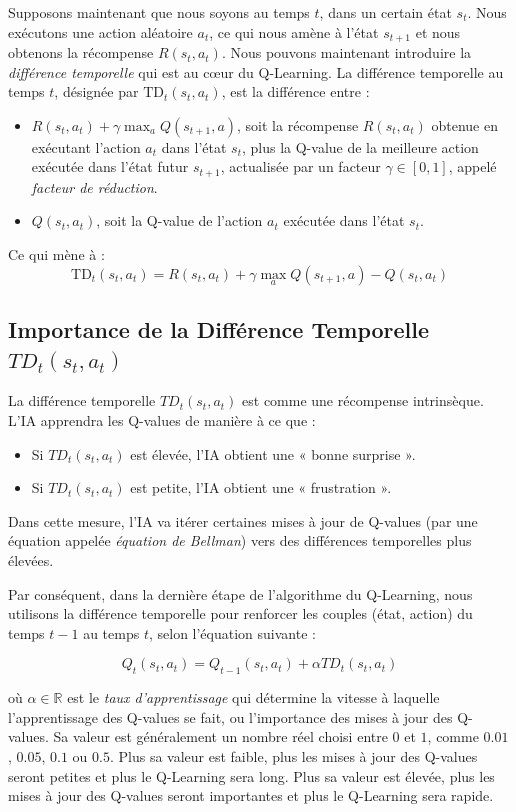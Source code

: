 \documentclass{article}
\begin{document}
Supposons maintenant que nous soyons au temps $t$, dans un certain état $s_t$. Nous exécutons une action aléatoire $a_t$, ce qui nous amène à l'état $s_{t+1}$ et nous obtenons la récompense $R(s_t, a_t)$.
Nous pouvons maintenant introduire la \emph{différence temporelle} qui est au cœur du Q-Learning. La différence temporelle au temps $t$, désignée par $\text{TD}_t(s_t, a_t)$, est la différence entre :
\begin{itemize}
    \item $R(s_t, a_t) + \gamma \max_a Q(s_{t+1}, a)$, soit la récompense $R(s_t, a_t)$ obtenue en exécutant l'action $a_t$ dans l'état $s_t$, plus la Q-value de la meilleure action exécutée dans l'état futur $s_{t+1}$, actualisée par un facteur $\gamma \in [0, 1]$, appelé \emph{facteur de réduction}.
    
    \item $Q(s_t, a_t)$, soit la Q-value de l'action $a_t$ exécutée dans l'état $s_t$.
\end{itemize}
Ce qui mène à :
\[
\text{TD}_t(s_t, a_t) = R(s_t, a_t) + \gamma \max_a Q(s_{t+1}, a) - Q(s_t, a_t)
\]
\subsection{Importance de la Différence Temporelle $TD_t(s_t, a_t)$ }

La différence temporelle $TD_t(s_t, a_t)$ est comme une récompense intrinsèque. L'IA apprendra les Q-values de manière à ce que :
\begin{itemize}
    \item Si $TD_t(s_t, a_t)$ est élevée, l'IA obtient une « bonne surprise ».
    \item Si $TD_t(s_t, a_t)$ est petite, l'IA obtient une « frustration ».
\end{itemize}

Dans cette mesure, l'IA va itérer certaines mises à jour de Q-values (par une équation appelée \emph{équation de Bellman}) vers des différences temporelles plus élevées.

Par conséquent, dans la dernière étape de l'algorithme du Q-Learning, nous utilisons la différence temporelle pour renforcer les couples (état, action) du temps $t-1$ au temps $t$, selon l'équation suivante :

\[
Q_t(s_t, a_t) = Q_{t-1}(s_t, a_t) + \alpha TD_t(s_t, a_t)
\]

où $\alpha \in \mathbb{R}$ est le \emph{taux d'apprentissage} qui détermine la vitesse à laquelle l'apprentissage des Q-values se fait, ou l'importance des mises à jour des Q-values. Sa valeur est généralement un nombre réel choisi entre $0$ et $1$, comme $0.01$, $0.05$, $0.1$ ou $0.5$. Plus sa valeur est faible, plus les mises à jour des Q-values seront petites et plus le Q-Learning sera long. Plus sa valeur est élevée, plus les mises à jour des Q-values seront importantes et plus le Q-Learning sera rapide.
\end{document}
